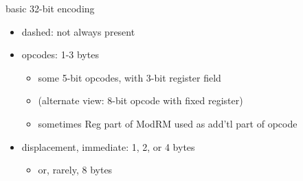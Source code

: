 \begin{frame}{basic 32-bit encoding}
\begin{itemize}
\item dashed: not always present
\item opcodes: 1-3 bytes
    \begin{itemize}
    \item some 5-bit opcodes, with 3-bit register field
    \item (alternate view: 8-bit opcode with fixed register)
    \item sometimes Reg part of ModRM used as add'tl part of opcode
    \end{itemize}
\item displacement, immediate: 1, 2, or 4 bytes
    \begin{itemize}
    \item or, rarely, 8 bytes
    \end{itemize}
\end{itemize}
\end{frame}

